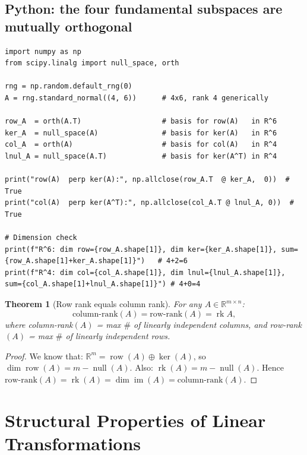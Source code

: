 \documentclass[11pt]{article}
\theoremstyle{definition}
\theoremstyle{plain}
\newtheorem{theorem}{Theorem}[section]
\begin{document}
\subsection{Python: the four fundamental subspaces are mutually orthogonal}
\begin{lstlisting}
import numpy as np
from scipy.linalg import null_space, orth

rng = np.random.default_rng(0)
A = rng.standard_normal((4, 6))      # 4x6, rank 4 generically

row_A  = orth(A.T)                   # basis for row(A)   in R^6
ker_A  = null_space(A)               # basis for ker(A)   in R^6
col_A  = orth(A)                     # basis for col(A)   in R^4
lnul_A = null_space(A.T)             # basis for ker(A^T) in R^4

print("row(A)  perp ker(A):", np.allclose(row_A.T  @ ker_A,  0))  # True
print("col(A)  perp ker(A^T):", np.allclose(col_A.T @ lnul_A, 0))  # True

# Dimension check
print(f"R^6: dim row={row_A.shape[1]}, dim ker={ker_A.shape[1]}, sum={row_A.shape[1]+ker_A.shape[1]}")   # 4+2=6
print(f"R^4: dim col={col_A.shape[1]}, dim lnul={lnul_A.shape[1]}, sum={col_A.shape[1]+lnul_A.shape[1]}") # 4+0=4
\end{lstlisting}


\begin{theorem}[Row rank equals column rank]
  For any $A \in \mathbb{R}^{m\times n}$:
  \[
    \text{column-rank}(A) = \text{row-rank}(A) = \operatorname{rk}A,
  \]
  where column-rank$(A)$ = max $\#$ of linearly independent columns,
  and row-rank$(A)$ = max $\#$ of linearly independent rows.
\end{theorem}
\begin{proof}
  We know that: $\mathbb{R}^m = \operatorname{row}(A)\oplus\ker(A)$, so
  $\dim\operatorname{row}(A) = m - \operatorname{null}(A)$.
  Also: $\operatorname{rk}(A) = m - \operatorname{null}(A)$.
  Hence $\text{row-rank}(A) = \operatorname{rk}(A) = \dim\operatorname{im}(A) = \text{column-rank}(A)$.
\end{proof}

\section{Structural Properties of Linear Transformations}
\end{document}
